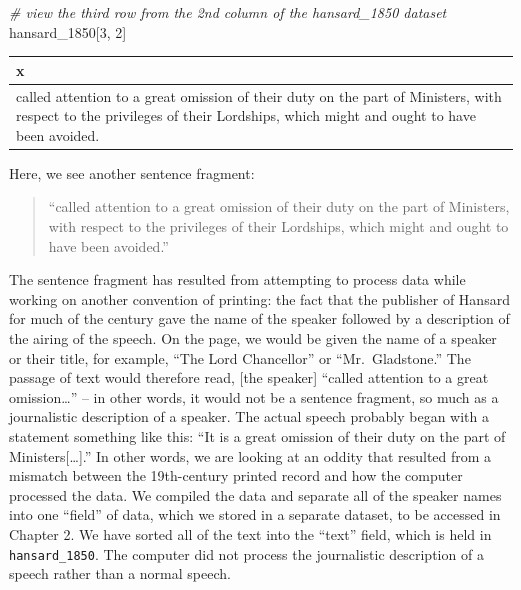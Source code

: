 \documentclass[
]{article}
\newenvironment{Shaded}{\begin{snugshade}}{\end{snugshade}}
\newcommand{\CommentTok}[1]{\textcolor[rgb]{0.56,0.35,0.01}{\textit{#1}}}
\newcommand{\DecValTok}[1]{\textcolor[rgb]{0.00,0.00,0.81}{#1}}
\newcommand{\NormalTok}[1]{#1}
\begin{document}
\begin{Shaded}
\begin{Highlighting}[]
\CommentTok{\# view the third row from the 2nd column of the hansard\_1850 dataset}
\NormalTok{hansard\_1850[}\DecValTok{3}\NormalTok{, }\DecValTok{2}\NormalTok{]}
\end{Highlighting}
\end{Shaded}

\begin{longtable}[]{@{}
  >{\raggedright\arraybackslash}p{}@{}}
\toprule\noalign{}
\begin{minipage}[b]{\linewidth}\raggedright
x
\end{minipage} \\
\midrule\noalign{}
\endhead
\bottomrule\noalign{}
\endlastfoot
called attention to a great omission of their duty on the part of
Ministers, with respect to the privileges of their Lordships, which
might and ought to have been avoided. \\
\end{longtable}

Here, we see another sentence fragment:

\begin{quote}
``called attention to a great omission of their duty on the part of
Ministers, with respect to the privileges of their Lordships, which
might and ought to have been avoided.''
\end{quote}

The sentence fragment has resulted from attempting to process data while
working on another convention of printing: the fact that the publisher
of Hansard for much of the century gave the name of the speaker followed
by a description of the airing of the speech. On the page, we would be
given the name of a speaker or their title, for example, ``The Lord
Chancellor'' or ``Mr.~Gladstone.'' The passage of text would therefore
read, {[}the speaker{]} ``called attention to a great omission\ldots{}''
-- in other words, it would not be a sentence fragment, so much as a
journalistic description of a speaker. The actual speech probably began
with a statement something like this: ``It is a great omission of their
duty on the part of Ministers{[}\ldots{]}.'' In other words, we are
looking at an oddity that resulted from a mismatch between the
19th-century printed record and how the computer processed the data. We
compiled the data and separate all of the speaker names into one
``field'' of data, which we stored in a separate dataset, to be accessed
in Chapter 2. We have sorted all of the text into the ``text'' field,
which is held in \texttt{hansard\_1850}. The computer did not process
the journalistic description of a speech rather than a normal speech.
\end{document}
